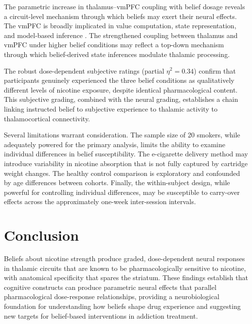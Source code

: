 \documentclass[12pt]{article}
\begin{document}
The parametric increase in thalamus--vmPFC coupling with belief dosage reveals a circuit-level mechanism through which beliefs may exert their neural effects. The vmPFC is broadly implicated in value computation, state representation, and model-based inference \citep{kable2009subjective, friston2014computational}. The strengthened coupling between thalamus and vmPFC under higher belief conditions may reflect a top-down mechanism through which belief-derived state inferences modulate thalamic processing.

The robust dose-dependent subjective ratings (partial $\eta^2 = 0.34$) confirm that participants genuinely experienced the three belief conditions as qualitatively different levels of nicotine exposure, despite identical pharmacological content. This subjective grading, combined with the neural grading, establishes a chain linking instructed belief to subjective experience to thalamic activity to thalamocortical connectivity.

Several limitations warrant consideration. The sample size of 20 smokers, while adequately powered for the primary analysis, limits the ability to examine individual differences in belief susceptibility. The e-cigarette delivery method may introduce variability in nicotine absorption that is not fully captured by cartridge weight changes. The healthy control comparison is exploratory and confounded by age differences between cohorts. Finally, the within-subject design, while powerful for controlling individual differences, may be susceptible to carry-over effects across the approximately one-week inter-session intervals.

\section{Conclusion}

Beliefs about nicotine strength produce graded, dose-dependent neural responses in thalamic circuits that are known to be pharmacologically sensitive to nicotine, with anatomical specificity that spares the striatum. These findings establish that cognitive constructs can produce parametric neural effects that parallel pharmacological dose-response relationships, providing a neurobiological foundation for understanding how beliefs shape drug experience and suggesting new targets for belief-based interventions in addiction treatment.



\end{document}
